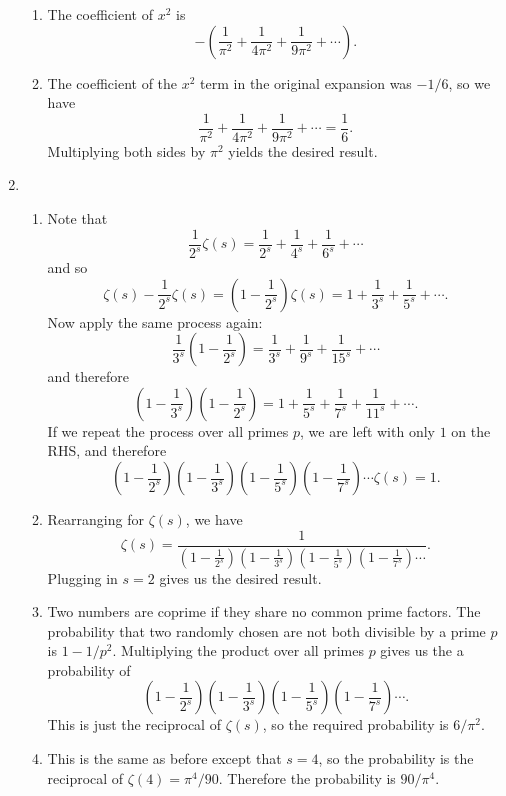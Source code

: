 \documentclass[a4paper,10pt]{article}
\begin{document}
\begin{enumerate}
\begin{enumerate}
\item The coefficient of \(x^2\) is \[-\left(\frac{1}{\pi^2}+\frac{1}{4\pi^2}+\frac{1}{9\pi^2}+\cdots\right).\]
\item The coefficient of the \(x^2\) term in the original expansion was \(-1/6\), so we have
	\[\frac{1}{\pi^2}+\frac{1}{4\pi^2}+\frac{1}{9\pi^2}+\cdots=\frac{1}{6}.\]
Multiplying both sides by \(\pi^2\) yields the desired result.
\end{enumerate}
\item
  \begin{enumerate}

\item Note that \[\frac{1}{2^s}\zeta(s)=\frac{1}{2^s}+\frac{1}{4^s}+\frac{1}{6^s}+\cdots\] and so \[\zeta(s)-\frac{1}{2^s}\zeta(s)=\left(1-\frac{1}{2^s}\right)\zeta(s)=1+\frac{1}{3^s}+\frac{1}{5^s}+\cdots.\]
  Now apply the same process again: \[\frac{1}{3^s}\left(1-\frac{1}{2^s}\right)=\frac{1}{3^s}+\frac{1}{9^s}+\frac{1}{15^s}+\cdots\] and therefore
  \[\left(1-\frac{1}{3^s}\right)\left(1-\frac{1}{2^s}\right)=1+\frac{1}{5^s}+\frac{1}{7^s}+\frac{1}{11^s}+\cdots.\]
  If we repeat the process over all primes \(p\), we are left with only \(1\) on the RHS, and therefore
  \[\left(1-\frac{1}{2^s}\right)\left(1-\frac{1}{3^s}\right)\left(1-\frac{1}{5^s}\right)\left(1-\frac{1}{7^s}\right)\cdots\zeta(s)=1.\]
\item Rearranging for \(\zeta(s)\), we have \[\zeta(s)=\frac{1}{\left(1-\frac{1}{2^s}\right)\left(1-\frac{1}{3^s}\right)\left(1-\frac{1}{5^s}\right)\left(1-\frac{1}{7^s}\right)\cdots}.\] Plugging in \(s=2\) gives us the desired result.
\item Two numbers are coprime if they share no common prime factors. The probability that two randomly chosen are not both divisible by a prime \(p\) is \(1-1/p^2\). Multiplying the product over all primes \(p\) gives us the a probability of \[\left(1-\frac{1}{2^s}\right)\left(1-\frac{1}{3^s}\right)\left(1-\frac{1}{5^s}\right)\left(1-\frac{1}{7^s}\right)\cdots.\]
  This is just the reciprocal of \(\zeta(s)\), so the required probability is \(6/\pi^2\).
\item This is the same as before except that \(s=4\), so the probability is the reciprocal of \(\zeta(4)=\pi^4/90\). Therefore the probability is \(90/\pi^4\).
  \end{enumerate}
  
\end{enumerate}
\end{document}
